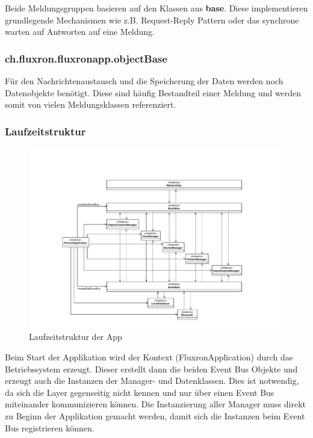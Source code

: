 Beide Meldungsgruppen basieren auf den Klassen aus \textbf{base}. Diese implementieren grundlegende Mechanismen wie z.B. Request-Reply Pattern oder das synchrone warten auf Antworten auf eine Meldung.

\subsubsection{ch.fluxron.fluxronapp.objectBase}
Für den Nachrichtenaustausch und die Speicherung der Daten werden noch Datenobjekte benötigt. Diese sind häufig Bestandteil einer Meldung und werden somit von vielen Meldungsklassen referenziert.

\subsubsection{Laufzeitstruktur}
\begin{figure}[H]
    \begin{center}
        \includegraphics[trim=100 30 0 90,clip,scale=0.7]{results/res/instances}
    \end{center}
    \caption{Laufzeitstruktur der App}
    \label{abb:instances}
\end{figure}

Beim Start der Applikation wird der Kontext (FluxronApplication) durch das Betriebssystem  erzeugt. Dieser erstellt dann die beiden Event Bus Objekte und erzeugt auch die Instanzen der Manager- und Datenklassen. Dies ist notwendig, da sich die Layer gegenseitig nicht kennen und nur über einen Event Bus miteinander kommunizieren können. Die Instanzierung aller Manager muss direkt zu Beginn der Applikation gemacht werden, damit sich die Instanzen beim Event Bus registrieren können.

